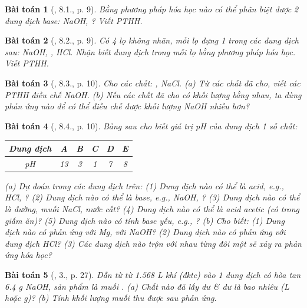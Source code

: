 \documentclass{article}
\newtheorem{baitoan}{Bài toán}
\begin{document}
\begin{baitoan}[\cite{SGK_Hoa_Hoc_9}, 8.1., p. 9]
	Bằng phương pháp hóa học nào có thể phân biệt được 2 dung dịch base: {\rm NaOH, }? Viết PTHH.
\end{baitoan}

\begin{baitoan}[\cite{SGK_Hoa_Hoc_9}, 8.2., p. 9]
	Có 4 lọ không nhãn, mỗi lọ đựng 1 trong các dung dịch sau: {\rm NaOH, , HCl}. Nhận biết dung dịch trong mỗi lọ bằng phương pháp hóa học. Viết {\rm PTHH}.
\end{baitoan}

\begin{baitoan}[\cite{SGK_Hoa_Hoc_9}, 8.3., p. 10]
	Cho các chất: {\rm{}, NaCl}. (a) Từ các chất đã cho, viết các {\rm PTHH} điều chế {\rm NaOH}. (b) Nếu các chất đã cho có khối lượng bằng nhau, ta dùng phản ứng nào để có thể điều chế được khối lượng {\rm NaOH} nhiều hơn?
\end{baitoan}

\begin{baitoan}[\cite{SGK_Hoa_Hoc_9}, 8.4., p. 10]
	Bảng sau cho biết giá trị pH của dung dịch 1 số chất:
	\begin{table}[H]
		\centering
		\begin{tabular}{|c|c|c|c|c|c|}
			\hline
			Dung dịch & A & B & C & D & E \\
			\hline
			pH & 13 & 3 & 1 & 7 & 8 \\
			\hline
		\end{tabular}
	\end{table}
	\noindent(a) Dự đoán trong các dung dịch trên: (1) Dung dịch nào có thể là acid, e.g., {\rm HCl, }? (2) Dung dịch nào có thể là base, e.g., {\rm NaOH, }? (3) Dung dịch nào có thể là đường, muối {\rm NaCl}, nước cất? (4) Dung dịch nào có thể là acid acetic (có trong giấm ăn)? (5) Dung dịch nào có tính base yếu, e.g., {\rm{}}? (b) Cho biết: (1) Dung dịch nào có phản ứng với {\rm Mg}, với {\rm NaOH}? (2) Dung dịch nào có phản ứng với dung dịch {\rm HCl}? (3) Các dung dịch nào trộn với nhau từng đôi một sẽ xảy ra phản ứng hóa học?	
\end{baitoan}

\begin{baitoan}[\cite{SGK_Hoa_Hoc_9}, 3., p. 27]
	Dẫn từ từ {\rm1.568 L} khí {\rm{}} (đktc) vào 1 dung dịch có hòa tan {\rm6.4 g NaOH}, sản phẩm là muối {\rm{}}. (a) Chất nào đã lấy dư \& dư là bao nhiêu ({\rm L} hoặc {\rm g})? (b) Tính khối lượng muối thu được sau phản ứng.
\end{baitoan}
\end{document}
